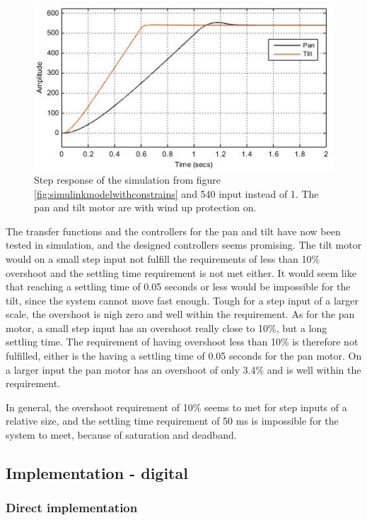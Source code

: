 \begin{figure}[h!]
\centering
\includegraphics[scale=0.7]{Billeder/SimuStepPanAndTiltWithWindUpProtection.jpg}
\caption{   Step response of the simulation from figure \ref{fig:simulinkmodelwithconstrains} and 540 input instead of 1. The pan and tilt motor are with wind up protection on.
 }
\label{fig:SimuStepPanAndTiltWithWindUpProtection}
\end{figure}

The transfer functions and the controllers for the pan and tilt have now been tested in simulation, and the designed controllers seems promising. The tilt motor would on a small step input not fulfill the requirements of less than 10\% overshoot and the settling time requirement is not met either. It would seem like that reaching a settling time of 0.05 seconds or less would be impossible for the tilt, since the system cannot move fast enough. Tough for a step input of a larger scale, the overshoot is nigh zero and well within the requirement.
As for the pan motor, a small step input has an overshoot really close to 10\%, but a long settling time. The requirement of having overshoot less than 10\% is therefore not fulfilled, either is the having a settling time of 0.05 seconds for the pan motor. On a larger input the pan motor has an overshoot of only 3.4\% and is well within the requirement.

In general, the overshoot requirement of 10\% seems to met for step inputs of a relative size, and the settling time requirement of 50 ms is impossible for the system to meet, because of saturation and deadband.

\subsection{Implementation - digital}

\subsubsection{Direct implementation}

